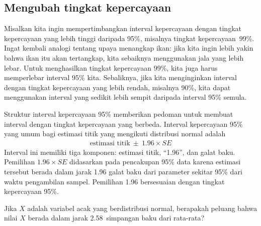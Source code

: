 
\subsection{Mengubah tingkat kepercayaan}
\label{changingTheConfidenceLevelSection}


Misalkan kita ingin mempertimbangkan interval kepercayaan dengan tingkat
kepercayaan yang lebih tinggi daripada 95\%, misalnya tingkat
kepercayaan~99\%. Ingat kembali analogi tentang upaya menangkap ikan:
jika kita ingin lebih yakin bahwa ikan itu akan tertangkap, kita sebaiknya menggunakan
jala yang lebih lebar. Untuk menghasilkan tingkat kepercayaan 99\%, kita juga harus memperlebar
interval 95\% kita. Sebaliknya, jika kita menginginkan interval dengan tingkat
kepercayaan yang lebih rendah, misalnya 90\%, kita dapat menggunakan interval yang sedikit lebih sempit
daripada interval 95\% semula.

Struktur interval kepercayaan 95\% memberikan pedoman untuk
membuat interval dengan tingkat kepercayaan yang berbeda.
Interval kepercayaan 95\% yang umum bagi estimasi titik
yang mengikuti distribusi normal adalah
\begin{eqnarray*}
\text{estimasi titik}\ \pm\ 1.96 \times SE
\end{eqnarray*}
Interval ini memiliki tiga komponen: estimasi titik,
``1.96'', dan galat baku. Pemilihan $1.96\times SE$
didasarkan pada pencakupan 95\% data karena estimasi tersebut berada dalam jarak
1.96 galat baku dari parameter sekitar 95\% dari waktu pengambilan sampel.
Pemilihan 1.96 bersesuaian dengan tingkat kepercayaan 95\%.

\begin{exercisewrap}
\begin{nexercise} \label{leadInForMakingA99PercentCIExercise}
Jika $X$ adalah variabel acak yang berdistribusi normal, berapakah
peluang bahwa nilai $X$ berada
dalam jarak 2.58~simpangan baku dari rata-rata?\footnotemark
\end{nexercise}
\end{exercisewrap}

